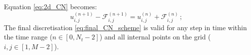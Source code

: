 Equation \eqref{eq:2d_CN} becomes:
\begin{equation}\label{eq:final_CN_scheme}
    u_{i,j}^{(n+1)} - \mathcal{F}_{i,j}^{(n+1)} = u_{i, j}^{(n)} + \mathcal{F}_{i,j}^{(n)} \, ;
\end{equation}
The final discretisation \eqref{eq:final_CN_scheme} is valid for any step in time within the time range ($n\in[0, N_t-2]$) and all internal points on the grid ($i,j \in [1, M-2]$).